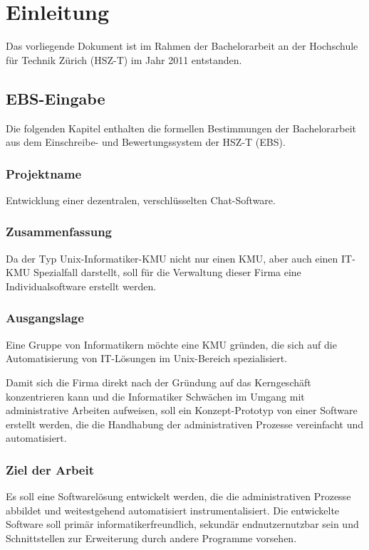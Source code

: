 \section{Einleitung}
Das vorliegende Dokument ist im Rahmen der Bachelorarbeit
an der Hochschule für Technik Zürich (HSZ-T) im Jahr 2011 entstanden.
\subsection{EBS-Eingabe}
Die folgenden Kapitel enthalten die formellen Bestimmungen der Bachelorarbeit
aus dem Einschreibe- und Bewertungssystem der HSZ-T (EBS).
\subsubsection{Projektname}
Entwicklung einer dezentralen, verschlüsselten Chat-Software.
\subsubsection{Zusammenfassung}
Da der Typ Unix-Informatiker-KMU nicht nur einen KMU, aber auch einen IT-KMU
Spezialfall darstellt, soll für die Verwaltung dieser Firma eine Individualsoftware
erstellt werden. 
\subsubsection{Ausgangslage}
Eine Gruppe von Informatikern möchte eine KMU gründen, die sich
auf die Automatisierung von IT-Lösungen im Unix-Bereich spezialisiert.

Damit sich die Firma direkt nach der Gründung auf das Kerngeschäft
konzentrieren kann und die Informatiker Schwächen im Umgang mit
administrative Arbeiten aufweisen, soll ein Konzept-Prototyp
von einer Software erstellt werden, die die Handhabung der
administrativen Prozesse vereinfacht und automatisiert.
\subsubsection{Ziel der Arbeit}
Es soll eine Softwarelösung entwickelt werden, die die administrativen
Prozesse abbildet und weitestgehend automatisiert instrumentalisiert.
Die entwickelte Software soll primär informatikerfreundlich,
sekundär endnutzernutzbar sein und Schnittstellen zur Erweiterung
durch andere Programme vorsehen.

